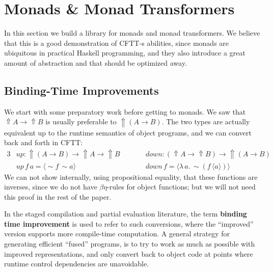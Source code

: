 \documentclass[acmsmall,screen,review,anonymous]{acmart}
\newcommand{\mit}[1]{\mathit{#1}}
\newcommand{\bs}[1]{\boldsymbol{#1}}
\newcommand{\ind}{\hspace{1em}}
\newcommand{\lam}{\lambda\,}
\newcommand{\Up}{{\Uparrow}}
\newcommand{\spl}{{\bs{\sim}}}
\newcommand{\ql}{{\bs{\langle}}}
\newcommand{\qr}{{\bs{\rangle}}}
\theoremstyle{remark}
\newcommand{\mup}{\mit{up}}
\newcommand{\mdown}{\mit{down}}
\begin{document}
\section{Monads \& Monad Transformers}\label{sec:monad-transformers}

In this section we build a library for monads and monad transformers. We believe
that this is a good demonstration of CFTT-s abilities, since monads are
ubiquitous in practical Haskell programming, and they also introduce a great
amount of abstraction and that should be optimized away.

\subsection{Binding-Time Improvements}\label{sec:binding-time-improvements}

We start with some preparatory work before getting to monads. We saw that $\Up
A \to \Up B$ is usually preferable to $\Up(A \to B)$. The two types are actually
equivalent up to the runtime semantics of object programs, and we can convert
back and forth in CFTT:
\begin{alignat*}{3}
  &\mup : \Up (A \to B) \to \Up A \to \Up B && \ind\ind \mdown : (\Up A \to \Up B) \to \Up (A \to B) \\
  &\mup\,f\,a = \ql \spl f\, \spl a\qr   && \ind\ind \mdown\,f = \ql \lam a.\,\spl(f\,\ql a \qr) \qr
\end{alignat*}
We can not show internally, using propositional equality, that these functions are
inverses, since we do not have $\beta\eta$-rules for object functions; but we
will not need this proof in the rest of the paper.

In the staged compilation and partial evaluation literature, the term
\textbf{binding time improvement} is used to refer to such conversions, where
the ``improved'' version supports more compile-time computation. A general
strategy for generating efficient ``fused'' programs, is to try to work as much
as possible with improved representations, and only convert back to object code
at points where runtime control dependencies are unavoidable.
\end{document}
